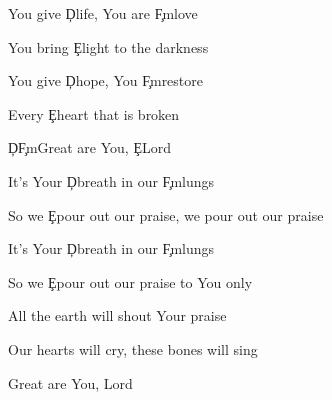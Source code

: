 \documentclass[9pt]{extarticle}
\begin{document}
\bsong

\bv
You give \c{D}life, You are \c{F\s m}love

You bring \c{E}light to the darkness

You give \c{D}hope, You \c{F\s m}restore

Every \c{E}heart that is broken

\c{D}\c{F\s m}Great are You, \c{E}Lord
\ev

\bc
It's Your \c{D}breath in our \c{F\s m}lungs

So we \c{E}pour out our praise, we pour out our praise

It's Your \c{D}breath in our \c{F\s m}lungs

So we \c{E}pour out our praise to You only
\ec



\bb[4]
All the earth will shout Your praise

Our hearts will cry, these bones will sing

Great are You, Lord
\eb


\esong
\end{document}
